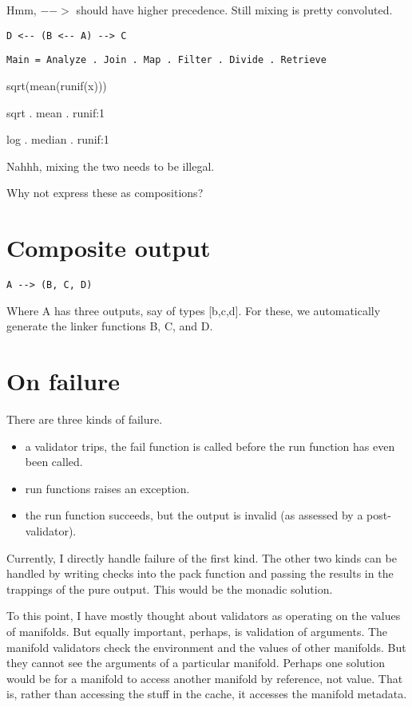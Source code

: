 \documentclass[12pt]{article}
\begin{document}
Hmm, $-->$ should have higher precedence. Still mixing is pretty convoluted.

\begin{verbatim}
D <-- (B <-- A) --> C
\end{verbatim}


\begin{verbatim}
Main = Analyze . Join . Map . Filter . Divide . Retrieve
\end{verbatim}


sqrt(mean(runif(x)))

sqrt . mean . runif:1

log . median . runif:1


Nahhh, mixing the two needs to be illegal.

Why not express these as compositions?


\section{Composite output}

\begin{verbatim}
A --> (B, C, D)
\end{verbatim}

Where A has three outputs, say of types [b,c,d]. For these, we automatically
generate the linker functions B, C, and D.

\section{On failure}

There are three kinds of failure.

\begin{itemize}
  \item a validator trips, the fail function is called before the run function has
     even been called.
  \item run functions raises an exception.
  \item the run function succeeds, but the output is invalid (as assessed by
     a post-validator).
\end{itemize}

Currently, I directly handle failure of the first kind. The other two kinds can
be handled by writing checks into the pack function and passing the results in
the trappings of the pure output. This would be the monadic solution.

To this point, I have mostly thought about validators as operating on the
values of manifolds. But equally important, perhaps, is validation of
arguments. The manifold validators check the environment and the values of
other manifolds. But they cannot see the arguments of a particular manifold.
Perhaps one solution would be for a manifold to access another manifold by
reference, not value. That is, rather than accessing the stuff in the cache, it
accesses the manifold metadata.
\end{document}
